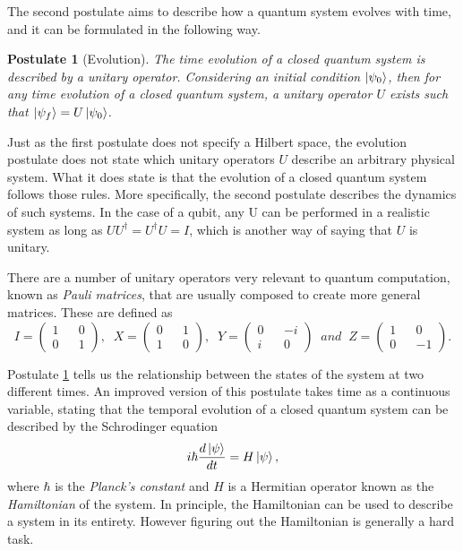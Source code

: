 \documentclass[../../../dissertation.tex]{subfiles}
\newtheorem{post}{Postulate}
\begin{document}
The second postulate aims to describe how a quantum system evolves with time,
and it can be formulated in the following way. 
\begin{post}[Evolution]
	\label{post:evolution}
	The time evolution of a closed quantum system is described by a unitary
	operator. Considering an initial condition $\ket{\psi_0}$, then for any
	time evolution of a closed quantum system, a unitary operator $U$ exists
	such that $\ket{\psi_f}=U\ket{\psi_0}$.\par
\end{post}
Just as the first postulate does not specify a Hilbert space, the evolution
postulate does not state which unitary operators $U$ describe an arbitrary
physical system. What it does state is that the evolution of a closed quantum
system follows those rules. More specifically, the second postulate describes
the dynamics of such systems. In the case of a qubit, any U can be performed in
a realistic system as long as $U U^\dag = U^\dag U = I$, which is another way
of saying that $U$ is unitary.\par  

There are a number of unitary operators very relevant to quantum computation, known
as \textit{Pauli matrices}, that are usually composed to create more general
matrices. These are defined as
\begin{equation}
	I = \begin{pmatrix} 
		1 && 0\\
		0 && 1
	    \end{pmatrix}, \; \;
	X = \begin{pmatrix} 
		0 && 1\\
		1 && 0
	    \end{pmatrix}, \; \;
	Y = \begin{pmatrix} 
		0 && -i\\
		i && 0
	    \end{pmatrix} \;\; and \; \;
	Z = \begin{pmatrix} 
		1 && 0\\
		0 && -1
	    \end{pmatrix}.
\end{equation}\par
Postulate \ref{post:evolution} tells us the relationship between the states of
the system at two different times. An improved version of this postulate takes
time as a continuous variable, stating that the temporal evolution of a closed
quantum system can be described by the Schrodinger equation 
\begin{equation}
	i \hbar \frac{d\ket{\psi}}{dt} = H \ket{\psi},
\end{equation}
where $\hbar$ is the \textit{Planck's constant} and $H$ is a Hermitian operator
known as the \textit{Hamiltonian} of the system. In principle, the Hamiltonian
can be used to describe a system in its entirety. However figuring out the
Hamiltonian is generally a hard task.\par
\end{document}
